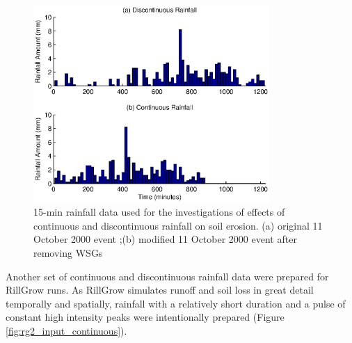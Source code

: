 \begin{figure}[htpb]
  \centering
    \includegraphics[width=0.8\textwidth]
{./img/rainfall_discont_cont_input}
  \caption[15-min rainfall data used for the investigations of effects of
continuous and discontinuous rainfall on soil erosion.]{15-min rainfall data
used for the investigations of effects of continuous and discontinuous rainfall
on soil erosion. (a) original 11 October 2000 event ;(b) modified 11 October
2000 event after removing WSGs}
  \label{fig:rainfall_discont_cont}
\end{figure}

Another set of continuous and discontinuous rainfall data were prepared for
RillGrow runs. As RillGrow simulates runoff and soil loss in great detail
temporally and spatially, rainfall with a relatively short duration and a pulse
of constant high intensity peaks were intentionally prepared (Figure
\ref{fig:rg2_input_continuous}).

